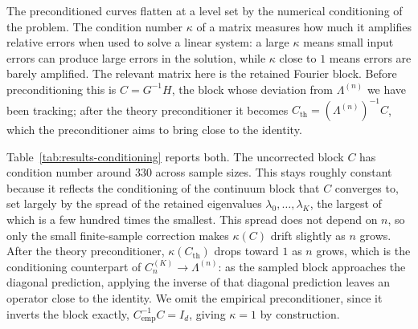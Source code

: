The preconditioned curves flatten at a level set by the numerical conditioning of
the problem. The condition number \(\kappa\) of a matrix measures how much it
amplifies relative errors when used to solve a linear system: a large \(\kappa\)
means small input errors can produce large errors in the solution, while
\(\kappa\) close to \(1\) means errors are barely amplified. The relevant matrix
here is the retained Fourier block. Before preconditioning this is \(C=G^{-1}H\),
the block whose deviation from \(\Lambda^{(n)}\) we have been tracking; after the
theory preconditioner it becomes \(C_{\mathrm{th}}=(\Lambda^{(n)})^{-1}C\), which
the preconditioner aims to bring close to the identity.

Table~\ref{tab:results-conditioning} reports both. The uncorrected block \(C\)
has condition number around \(330\) across sample sizes. This stays roughly
constant because it reflects the conditioning of the continuum block that \(C\)
converges to, set largely by the spread of the retained eigenvalues
\(\lambda_0,\dots,\lambda_K\), the largest of which is a few hundred times the
smallest. This spread does not depend on \(n\), so only the small finite-sample
correction makes \(\kappa(C)\) drift slightly as \(n\) grows. After the theory
preconditioner, \(\kappa(C_{\mathrm{th}})\) drops toward \(1\) as \(n\) grows,
which is the conditioning counterpart of \(C_n^{(K)}\to\Lambda^{(n)}\): as the
sampled block approaches the diagonal prediction, applying the inverse of that
diagonal prediction leaves an operator close to the identity. We omit the
empirical preconditioner, since it inverts the block exactly,
\(C_{\mathrm{emp}}^{-1}C=I_d\), giving \(\kappa=1\) by construction.

